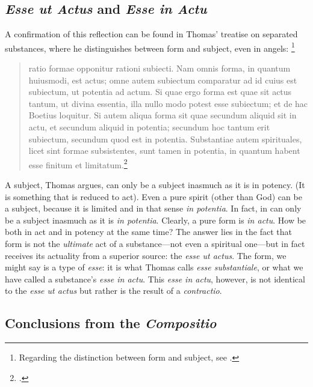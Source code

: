 \subsection{\emph{Esse ut Actus} and \emph{Esse in Actu}}
A confirmation of this reflection can be found in Thomas' treatise on separated substances, where he distinguishes between form and subject, even in angels:%
%
\footnote{Regarding the distinction between form and subject, see \cite[54]{contat:esse-essentia-ordo}.}
%
\begin{quotation}
ratio formae opponitur rationi subiecti. Nam omnis forma, in quantum huiusmodi, est actus; omne autem subiectum comparatur ad id cuius est subiectum, ut potentia ad actum. Si quae ergo forma est quae sit actus tantum, ut divina essentia, illa nullo modo potest esse subiectum; et de hac Boetius loquitur. Si autem aliqua forma sit quae secundum aliquid sit in actu, et secundum aliquid in potentia; secundum hoc tantum erit subiectum, secundum quod est in potentia. Substantiae autem spirituales, licet sint formae subsistentes, sunt tamen in potentia, in quantum habent esse finitum et limitatum.\footcite[a.~1, ad~1]{st:spiritualibus}
\end{quotation}
%
A subject, Thomas argues, can only be a subject inasmuch as it is in potency. (It is something that is reduced to act). Even a pure spirit (other than God) can be a subject, because it is limited and in that sense \emph{in potentia}. In fact, in can only be a subject inasmuch as it is \emph{in potentia}. Clearly, a pure form is \emph{in actu}. How be both in act and in potency at the same time? The answer lies in the fact that form is not the \emph{ultimate} act of a substance---not even a spiritual one---but in fact receives its actuality from a superior source: the \emph{esse ut actus}. The form, we might say is a type of \emph{esse}: it is what Thomas calls \emph{esse substantiale}, or what we have called a substance's \emph{esse in actu}. This \emph{esse in actu}, however, is not identical to the \emph{esse ut actus} but rather is the result of a \emph{contractio}.

\subsection{Conclusions from the \emph{Compositio}}

